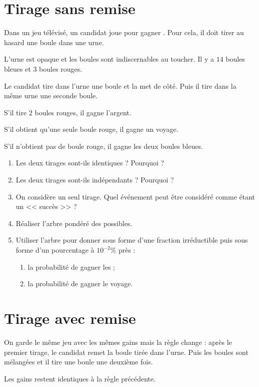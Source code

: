 \documentclass[12pt,openright,twoside,french]{book}
\begin{document}

\section*{Tirage sans remise}

Dans un jeu télévisé, un candidat joue pour gagner . Pour cela, il doit tirer au hasard une boule dans une urne.\par
L'urne est opaque et les boules sont indiscernables au toucher. Il y a $14$ boules bleues et $3$ boules rouges.\par
Le candidat tire dans l'urne une boule et la met de côté. Puis il tire dans la même urne une seconde boule.\par
S'il tire 2 boules rouges, il gagne l'argent.\par
S'il obtient qu'une seule boule rouge, il gagne un voyage.\par
S'il n'obtient pas de boule rouge, il gagne les deux boules bleues.\medskip

\begin{enumerate}
    \item Les deux tirages sont-ils identiques ? Pourquoi ?
    \item Les deux tirages sont-ils indépendants ? Pourquoi ?
    \item On considère un seul tirage. Quel événement peut être considéré comme étant un << succès >> ?
    \item Réaliser l'arbre pondéré des possibles.
    \item Utiliser l'arbre pour donner sous forme d'une fraction irréductible puis sous forme d'un pourcentage à $10^{-2}\%$ près :
    \begin{enumerate}
        \item la probabilité de gagner les  ;
        \item la probabilité de gagner le voyage.
    \end{enumerate}
\end{enumerate}

\section*{Tirage avec remise}

On garde le même jeu avec les mêmes gains mais la règle change :
après le premier tirage, le candidat remet la boule tirée dans l'urne. Puis les boules sont mélangées et il tire une boule une deuxième fois.\par
Les gains restent identiques à la règle précédente.\medskip
\end{document}
